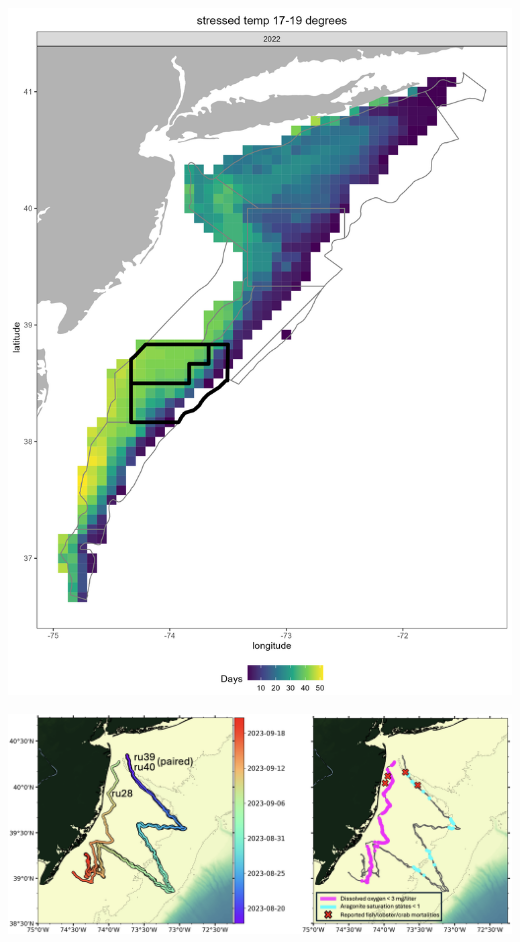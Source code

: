 \documentclass[
  10pt,
]{article}
\let\origfigure\figure
\let\endorigfigure\endfigure
\renewenvironment{figure}[1][2] {
    \expandafter\origfigure\expandafter[H]
} {
    \endorigfigure
}
\begin{document}
\begin{figure}

{\centering \includegraphics[width=0.6\linewidth]{SOE-NEFMC_files/figure-latex/scallop-thermal-2022-1} 

}

\caption{The number of days where bottom temperature was between 17 and 19 ℃ in each GLORYS grid cell for 2022. The gray lines show the sea scallop estimation areas, with the Elephant Trunk region highlighted in black lines.}\label{fig:scallop-thermal-2022}
\end{figure}
\begin{figure}

{\centering \includegraphics[width=0.6\linewidth]{SOE-NEFMC_files/figure-latex/hypoxia-2023-1} 

}

\caption{Mission tracks of three gliders (left) deployed off the coast of New Jersey in August and September of 2023. Locations of hypoxic levels of dissolved oxygen (magenta; < 3 mg/liter) and low aragonite saturation state (cyan; < 1) measured along the glider mission tracks and locations of reported fish, lobster, and/or crab mortalities (red X).}\label{fig:hypoxia-2023}
\end{figure}
\end{document}
